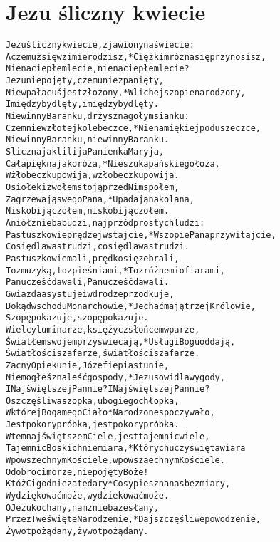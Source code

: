 \documentclass[a4paper,12pt]{article}
\begin{document}
\section*{Jezu śliczny kwiecie}
\begin{alltt}
Jezu śliczny kwiecie, zjawiony na świecie:
A czemuż się w zimie rodzisz, * Ciężki mróz na się przynosisz,
                  Nie na ciepłem lecie, nie na ciepłem lecie?
Jezu niepojęty, czemu nie z panięty,
Nie w pałacuś jest złożony, * W lichej szopie narodzony,
                  I między bydlęty, i między bydlęty.
Niewinny Baranku, drżysz na gołym sianku:
Czem nie w złotej kolebeczce, * Nie na miękiej poduszeczce,
                  Niewinny Baranku, niewinny Baranku.
Śliczna jak lilija Panienka Maryja,
Cała piękna jako róża, * Nie szuka pańskiego łoża,
                  W żłobeczku powija, w żłobeczku powija.
Osiołek i z wołem stoją przed Nim społem,
Zagrzewają swego Pana, * Upadają na kolana,
                   Nisko biją czołem, nisko biją czołem.
Aniół z nieba budzi, najprzód prostych ludzi:
Pastuszkowie prędzej wstajcie, * W szopie Pana przywitajcie,
                   Co się dla was trudzi, co się dla was trudzi.
Pastuszkowie mali, prędko się zebrali,
To z muzyką, to z pieśniami, * To z różnemi ofiarami,
                   Panu cześć dawali, Panu cześć dawali.
Gwiazda asystuje i w drodze przodkuje,
Dokąd wschodu Monarchowie, * Jechać mają trzej Królowie,
                   Szopę pokazuje, szopę pokazuje.
Wielcy luminarze, księżyc z słońcem w parze,
Światłem swojem przyświecają, * Usługi Bogu oddają,
                   Światłości szafarze, światłości szafarze.
Zacny Opiekunie, Józefie piastunie,
Nie mogłeś znaleść gospody, * Jezusowi dla wygody,
                    I Najświętszej Pannie? I Najświętszej Pannie?
O szczęśliwa szopka, ubogiego chłopka,
W której Boga mego Ciało * Narodzone spoczywało,
                     Jest pokory próbka, jest pokory próbka.
W tem najświętszem Ciele, jest tajemnic wiele,
Tajemnic Boskich niemiara, * Których uczy święta wiara
                      W powszechnym Kościele, w powszaechnym Kościele.
O dobroci morze, niepojęty Boże!
Któż Ci godnie za te dary * Co sypiesz na nas bez miary,
                       Wydziękować może, wydziekować może.
O Jezu kochany, nam z nieba zesłany,
Przez Twe święte Narodzenie, * Daj szczęśliwe powodzenie,
                        Żywot pożądany, żywot pożądany.
\end{alltt}
\end{document}
